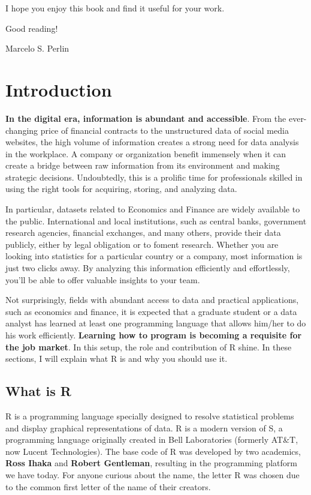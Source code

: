 \documentclass[
  12pt,
]{book}
\begin{document}
I hope you enjoy this book and find it useful for your work.

Good reading!

Marcelo S. Perlin

\hypertarget{introduction}{%
\chapter{Introduction}\label{introduction}}

\textbf{In the digital era, information is abundant and accessible}. From the ever-changing price of financial contracts to the unstructured data of social media websites, the high volume of information creates a strong need for data analysis in the workplace. A company or organization benefit immensely when it can create a bridge between raw information from its environment and making strategic decisions. Undoubtedly, this is a prolific time for professionals skilled in using the right tools for acquiring, storing, and analyzing data.

In particular, datasets related to Economics and Finance are widely available to the public. International and local institutions, such as central banks, government research agencies, financial exchanges, and many others, provide their data publicly, either by legal obligation or to foment research. Whether you are looking into statistics for a particular country or a company, most information is just two clicks away. By analyzing this information efficiently and effortlessly, you'll be able to offer valuable insights to your team.

Not surprisingly, fields with abundant access to data and practical applications, such as economics and finance, it is expected that a graduate student or a data analyst has learned at least one programming language that allows him/her to do his work efficiently. \textbf{Learning how to program is becoming a requisite for the job market}. In this setup, the role and contribution of R shine. In these sections, I will explain what R is and why you should use it.

\hypertarget{what-is-r}{%
\section{What is R}\label{what-is-r}}

R is a programming language specially designed to resolve statistical problems and display graphical representations of data. R is a modern version of S, a programming language originally created in Bell Laboratories (formerly AT\&T, now Lucent Technologies). The base code of R was developed by two academics, \textbf{Ross Ihaka} and \textbf{Robert Gentleman}, resulting in the programming platform we have today. For anyone curious about the name, the letter R was chosen due to the common first letter of the name of their creators.  
\end{document}
